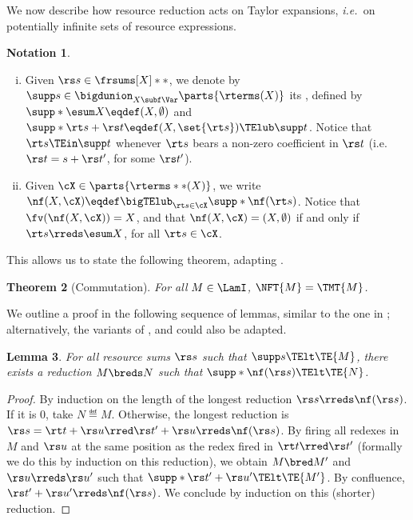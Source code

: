 \documentclass[10pt,a4paper]{amsart}
\newtheorem{theorem}{Theorem}
\newtheorem{lemma}[theorem]{Lemma}
\theoremstyle{definition}
\newtheorem{notation}[theorem]{Notation}
\newcommand{\bsub}{\begin{enumerate}[(i)]}
\newcommand{\esub}{\end{enumerate}}
\begin{document}
We now describe how resource reduction acts on Taylor expansions, \emph{i.e.\ }on potentially infinite sets of resource expressions.

\begin{notation} \label{not:support}\mbox{}
\bsub
\item Given $\rs s \in \frsums[X]**$,
	we denote by $\supp s \in \bigdunion_{X \subf \Var} \parts{\rterms(X)}$ 
	its , defined by
	$\supp*{\esum X} \eqdef (X,\emptyset)$ and
	$\supp*{\rt s + \rs t} \eqdef (X,\set{\rt s}) \TElub \supp t$.
	Notice that $\rt s \TEin \supp t$ whenever $\rt s$ 
	bears a non-zero coefficient in $\rs t$ (i.e.\ $\rs t = s + \rs t'$, for some $\rs t'$).
\item Given $\cX \in \parts{\rterms**(X)}$, we write 
	$\nf(X, \cX) \eqdef \bigTElub_{\rt s \in \cX} \supp*{ \nf(\rt s) }$.
	Notice that $\fv(\nf(X, \cX)) = X$, and that
	$\nf(X, \cX) = (X, \emptyset)$ if and only if
	$\rt s \rreds \esum X$, for all $\rt s \in \cX$.
\esub
\end{notation}

This allows us to state the following theorem,
adapting \cite[Theorem~2]{Ehrhard.Reg.06}.


\begin{theorem}[Commutation] \label{the:commutation}
	For all $M \in \LamI$, $\NFT{M} = \TMT{M}$.
\end{theorem}


We outline a proof in the following sequence of lemmas,
similar to the one in \cite{Barbarossa.Man.19};
alternatively, the variants of \cite{Ehrhard.Reg.06,Ehrhard.Reg.08},
\cite{OlimpieriVaux22} and \cite{Cerda.24,CerdaVaux23}
could also be adapted.

\setcounter{lem:rred-conserv-bred}{\thetheorem}
\begin{lemma}
\label{lem:rred-conserv-bred}
	For all resource sums $\rs s$ such that $\supp s \TElt \TE{M}$,
	there exists a reduction $M \breds N$
	such that $\supp*{\nf(\rs s)} \TElt \TE{N}$.
\end{lemma}

	\begin{proof}
	By induction on the length of the longest reduction 
	$\rs s \rreds \nf(\rs s)$.
	If it is $0$, take $N \eqdef M$.
	Otherwise, the longest reduction is
	$\rs s = \rt t + \rs u \rred \rs t' + \rs u \rreds \nf(\rs s)$.
	By firing all redexes in $M$ and $\rs u$ at the same position
	as the redex fired in $\rt t \rred \rs t'$
	(formally we do this by induction on this reduction),
	we obtain $M \bred M'$ and $\rs u \rreds \rs u'$ such that
	$\supp*{\rs t' + \rs u'} \TElt \TE{M'}$.
	By confluence, $\rs t' + \rs u' \rreds \nf(\rs s)$.
	We conclude by induction on this (shorter) reduction.
	\end{proof}
\end{document}
